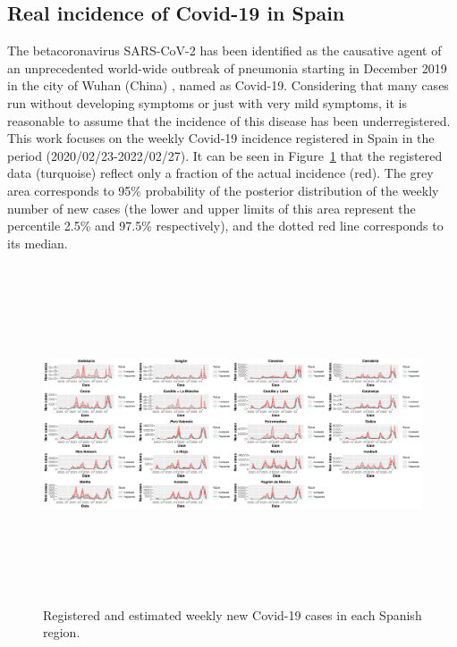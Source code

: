 \documentclass{article}
\begin{document}
\subsection{Real incidence of Covid-19 in Spain}\label{covid}
The betacoronavirus SARS-CoV-2 has been identified as the causative agent of an unprecedented world-wide outbreak of pneumonia starting in December 2019 in the city of Wuhan (China) \cite{Sohrabi2020}, named as Covid-19. Considering that many cases run without developing symptoms or just with very mild symptoms, it is reasonable to assume that the incidence of this disease has been underregistered. This work focuses on the weekly Covid-19 incidence registered in Spain in the period (2020/02/23-2022/02/27). It can be seen in Figure~\ref{morina:fig1} that the registered data (turquoise) reflect only a fraction of the actual incidence (red). The grey area corresponds to 95\% probability of the posterior distribution of the weekly number of new cases (the lower and upper limits of this area represent the percentile 2.5\% and 97.5\% respectively), and the dotted red line corresponds to its median.
\begin{figure}[h]
\setlength{\fboxsep}{0pt}%
\setlength{\fboxrule}{0pt}%
\begin{center}
  \includegraphics[height=10cm, width=17cm]{morinafig1}
  \caption{\label{morina:fig1} Registered and estimated weekly new Covid-19 cases in each Spanish region.}
  \end{center}
\end{figure}  
\end{document}
